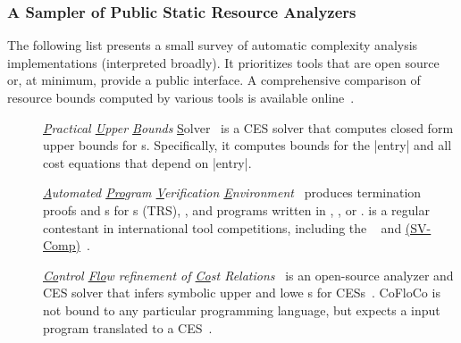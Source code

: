 \subsubsection{A Sampler of Public Static Resource Analyzers}
\label{resource-analysis-tools}

The following list presents a small survey of automatic complexity analysis
implementations (interpreted broadly). It prioritizes tools that are open source
or, at minimum, provide a public interface. A comprehensive comparison of
resource bounds computed by various tools is available
online~\cite{flores_experiments}.

\begin{description}

\item[\href{https://costa.fdi.ucm.es/~costa/pubs/pubs.php}{}]
      \emph{\underline{P}ractical \underline{U}pper \underline{B}ounds}
      \underline{S}olver~\cite{albert2010}
      is a CES solver that computes closed form upper bounds for s. Specifically, it computes bounds for the \pr|entry| and
      all cost equations that depend on \pr|entry|.

\item[\href{https://aprove.informatik.rwth-aachen.de}{}]
      \emph{\underline{A}utomated \underline{Pro}gram \underline{V}erification
      \underline{E}nvironment}~\cite{giesl2016} produces termination proofs and
      s for s (TRS), , and programs written in , ,
      or .
       is a regular contestant in international tool competitions,
      including the
      \href{https://termination-portal.org/wiki/Termination_Competition}%
      {}~\cite{giesl2019}
      and \href{https://sv-comp.sosy-lab.org}%
      { (SV-Comp)}~\cite{beyer2022}.

\item[\href{https://github.com/aeflores/CoFloCo}{}]
    \emph{\underline{Co}ntrol \underline{Flo}w refinement of \underline{Co}st
    Relations}~\cite{floresmontoya2014} is an open-source analyzer and CES
    solver that infers symbolic upper and lowe s for CESs~\cite{flores-montoya2016}. CoFloCo
    is not bound to any particular programming language, but expects a input
    program translated to a CES~\cite{flores2016}.


\end{description}
